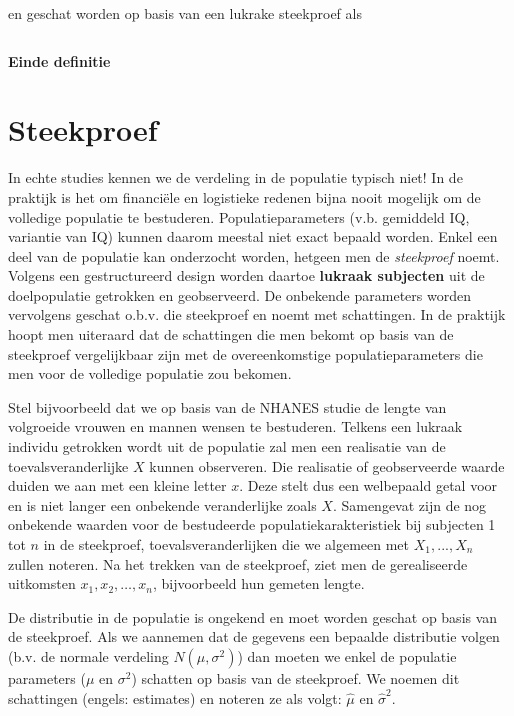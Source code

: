 \documentclass[
  12pt,dutch,coursenotes]{book}
\theoremstyle{definition}
\theoremstyle{definition}
\theoremstyle{definition}
\theoremstyle{definition}
\theoremstyle{remark}
\begin{document}
\begin{equation*}
[\mu-z_{\alpha/2}\sigma,\mu+z_{\alpha/2}\sigma]
\end{equation*}

en geschat worden op basis van een lukrake steekproef als

\begin{equation*}
[\bar x-z_{\alpha/2}s_x,\bar x+z_{\alpha/2}s_x]
\end{equation*}

\textbf{Einde definitie}

\hypertarget{steekproef}{%
\section{Steekproef}\label{steekproef}}

In echte studies kennen we de verdeling in de populatie typisch niet!
In de praktijk is het om financiële en logistieke redenen bijna nooit mogelijk om de
volledige populatie te bestuderen. Populatieparameters (v.b. gemiddeld IQ, variantie van IQ) kunnen daarom meestal
niet exact bepaald worden. Enkel een deel van de populatie kan onderzocht
worden, hetgeen men de \emph{steekproef} noemt. Volgens een
gestructureerd design worden daartoe \textbf{lukraak subjecten} uit de doelpopulatie
getrokken en geobserveerd. De onbekende parameters worden vervolgens geschat
o.b.v. die steekproef en noemt met schattingen. In de praktijk hoopt men uiteraard dat de schattingen die men bekomt op basis van de steekproef vergelijkbaar zijn met de overeenkomstige populatieparameters die men voor de volledige populatie zou bekomen.

Stel bijvoorbeeld dat we op basis van de NHANES studie de lengte van volgroeide vrouwen en mannen wensen te bestuderen.
Telkens een lukraak individu getrokken wordt uit de populatie zal men een
realisatie van de toevalsveranderlijke \(X\) kunnen observeren. Die realisatie
of geobserveerde waarde duiden we aan met een kleine letter \(x\). Deze stelt
dus een welbepaald getal voor en is niet langer een onbekende veranderlijke
zoals \(X\). Samengevat zijn de nog onbekende waarden voor de
bestudeerde populatiekarakteristiek bij subjecten 1 tot \(n\) in de
steekproef, toevalsveranderlijken die we algemeen met \(X_1,...,X_n\)
zullen noteren. Na het trekken van de steekproef, ziet men de gerealiseerde
uitkomsten \(x_1, x_2, \dots, x_n\), bijvoorbeeld hun gemeten lengte.

De distributie in de populatie is ongekend en moet worden geschat op basis van de steekproef. Als we aannemen dat de gegevens een bepaalde distributie volgen (b.v. de normale verdeling \(N(\mu,\sigma^2)\)) dan moeten we enkel de populatie parameters (\(\mu\) en \(\sigma^2\)) schatten op basis van de steekproef. We noemen dit schattingen (engels: estimates) en noteren ze als volgt: \(\hat \mu\) en \(\hat \sigma^2\).
\end{document}
